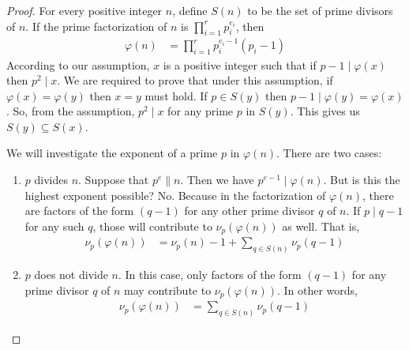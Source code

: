 	\begin{proof}
		For every positive integer $n$, define $S(n)$ to be the set of prime divisors of $n$. If the prime factorization of $n$ is $\prod_{i=1}^{r}p_i^{e_i}$, then
			\begin{align*}
				\varphi(n) & = \prod_{i=1}^{r}p_i^{e_i-1}(p_i-1)
			\end{align*}
		According to our assumption, $x$ is a positive integer such that if $p-1\mid \varphi(x)$ then $p^2\mid x$. We are required to prove that under this assumption, if $\varphi(x)=\varphi(y)$ then $x=y$ must hold. If $p\in S(y)$ then $p-1\mid \varphi(y)=\varphi(x)$. So, from the assumption, $p^2\mid x$ for any prime $p$ in $S(y)$. This gives us $S(y)\subseteq S(x)$.

		We will investigate the exponent of a prime $p$ in $\varphi(n)$. There are two cases:
			\begin{enumerate}
				\item $p$ divides $n$. Suppose that $p^e\|n$. Then we have $p^{e-1}\mid \varphi(n)$. But is this the highest exponent possible? No. Because in the factorization of $\varphi(n)$, there are factors of the form $(q-1)$ for any other prime divisor $q$ of $n$. If $p\mid q-1$ for any such $q$, those will contribute to $\nu_{p}(\varphi(n))$ as well. That is,
					\begin{align*}
						\nu_{p}(\varphi(n)) & = \nu_{p}(n)-1+\sum_{q\in S(n)}\nu_{p}(q-1)
					\end{align*}

				\item $p$ does not divide $n$. In this case, only factors of the form $(q-1)$ for any prime divisor $q$ of $n$ may contribute to $\nu_{p}(\varphi(n))$. In other words,
					\begin{align*}
						\nu_{p}(\varphi(n)) & = \sum_{q\in S(n)}\nu_{p}(q-1)
					\end{align*}
			\end{enumerate}


\end{proof}
